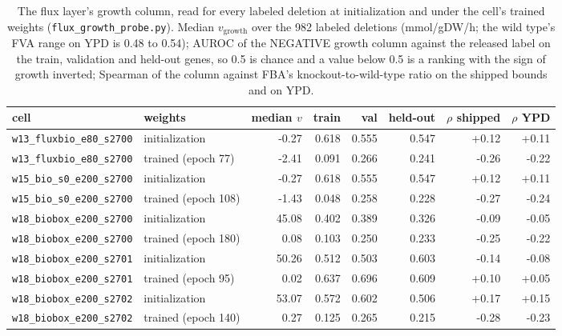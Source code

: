 \begin{table}[H]
  \centering
  \footnotesize
  \caption[Flux growth probe]{The flux layer's growth column, read for every labeled deletion at initialization and under the cell's trained weights (\texttt{flux\_growth\_probe.py}). Median $v_{\text{growth}}$ over the 982 labeled deletions (mmol/gDW/h; the wild type's FVA range on YPD is 0.48 to 0.54); AUROC of the NEGATIVE growth column against the released label on the train, validation and held-out genes, so 0.5 is chance and a value below 0.5 is a ranking with the sign of growth inverted; Spearman of the column against FBA's knockout-to-wild-type ratio on the shipped bounds and on YPD.}
  \label{tab:growth-probe}
  \begin{tabular}{@{}llrrrrrr@{}}
    \hline
    cell & weights & median $v$ & train & val & held-out & $\rho$ shipped & $\rho$ YPD \\
    \hline
    \texttt{w13\_fluxbio\_e80\_s2700} & initialization & -0.27 & 0.618 & 0.555 & 0.547 & +0.12 & +0.11 \\
    \texttt{w13\_fluxbio\_e80\_s2700} & trained (epoch 77) & -2.41 & 0.091 & 0.266 & 0.241 & -0.26 & -0.22 \\
    \texttt{w15\_bio\_s0\_e200\_s2700} & initialization & -0.27 & 0.618 & 0.555 & 0.547 & +0.12 & +0.11 \\
    \texttt{w15\_bio\_s0\_e200\_s2700} & trained (epoch 108) & -1.43 & 0.048 & 0.258 & 0.228 & -0.27 & -0.24 \\
    \texttt{w18\_biobox\_e200\_s2700} & initialization & 45.08 & 0.402 & 0.389 & 0.326 & -0.09 & -0.05 \\
    \texttt{w18\_biobox\_e200\_s2700} & trained (epoch 180) & 0.08 & 0.103 & 0.250 & 0.233 & -0.25 & -0.22 \\
    \texttt{w18\_biobox\_e200\_s2701} & initialization & 50.26 & 0.512 & 0.503 & 0.603 & -0.14 & -0.08 \\
    \texttt{w18\_biobox\_e200\_s2701} & trained (epoch 95) & 0.02 & 0.637 & 0.696 & 0.609 & +0.10 & +0.05 \\
    \texttt{w18\_biobox\_e200\_s2702} & initialization & 53.07 & 0.572 & 0.602 & 0.506 & +0.17 & +0.15 \\
    \texttt{w18\_biobox\_e200\_s2702} & trained (epoch 140) & 0.27 & 0.125 & 0.265 & 0.215 & -0.28 & -0.23 \\

\end{tabular}
\end{table}
